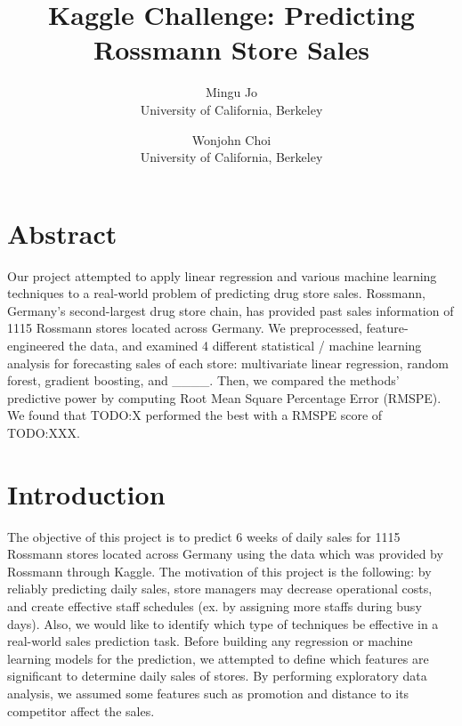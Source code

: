 \documentclass[letterpaper,twocolumn,10pt]{article}
\begin{document}
\date{}

\title{\Large \bf Kaggle Challenge: Predicting Rossmann Store Sales}

\author{
  {\rm Mingu Jo}\\
  University of California, Berkeley
  \and
      {\rm Wonjohn Choi}\\
      University of California, Berkeley
} %

\maketitle

\thispagestyle{empty}


\section{Abstract}
Our project attempted to apply linear regression and various machine learning techniques to a real-world problem of predicting drug store sales. Rossmann, Germany's second-largest drug store chain, has provided past sales information of 1115 Rossmann stores located across Germany. We preprocessed, feature-engineered the data, and examined 4 different statistical / machine learning analysis for forecasting sales of each store: multivariate linear regression, random forest, gradient boosting, and ____. Then, we compared the methods' predictive power by computing Root Mean Square Percentage Error (RMSPE). We found that TODO:X performed the best with a RMSPE score of TODO:XXX.


\section{Introduction}
The objective of this project is to predict 6 weeks of daily sales for 1115 Rossmann stores located across Germany using the data which was provided by Rossmann through Kaggle. The motivation of this project is the following: by reliably predicting daily sales, store managers may decrease operational costs, and create effective staff schedules (ex. by assigning more staffs during busy days). Also, we would like to identify which type of techniques be effective in a real-world sales prediction task. Before building any regression or machine learning models for the prediction, we attempted to define which features are significant to determine daily sales of stores. By performing exploratory data analysis, we assumed some features such as promotion and distance to its competitor affect the sales. %
\end{document}
